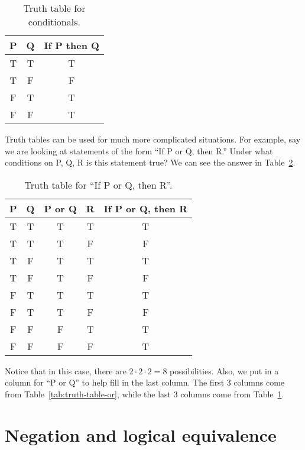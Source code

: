 \documentclass{tufte-book}
\begin{document}
\begin{table}
  \centering
  \begin{tabular}{ccc}
    \toprule
    P & Q & If P then Q \\ \midrule
    T & T & T \\
    T & F & F \\
    F & T & T \\
    F & F & T \\ \bottomrule
  \end{tabular}
  \caption{Truth table for conditionals.}
  \label{tab:truth-table-conditionals}
\end{table}
Truth tables can be used for much more complicated situations. For example, say we are looking at statements of the form ``If P or Q, then R.'' Under what conditions on P, Q, R is this statement true? We can see the answer in Table~\ref{tab:truth-table-if-p-or-q-then-r}.

\begin{table}
  \centering
  \begin{tabular}{ccccc}
    \toprule
    P & Q & P or Q & R & If P or Q, then R \\ \midrule
    T & T & T & T & T\\
    T & T & T & F & F\\
    T & F & T & T & T\\
    T & F & T & F & F\\ 
    F & T & T & T & T \\
    F & T & T & F & F \\
    F & F & F & T & T \\
    F & F & F & F & T \\
    \bottomrule
  \end{tabular}
  \caption{Truth table for ``If P or Q, then R''.}
  \label{tab:truth-table-if-p-or-q-then-r}
\end{table}
Notice that in this case, there are $2 \cdot 2 \cdot 2 = 8$ possibilities. Also, we put in a column for ``P or Q'' to help fill in the last column. The first 3 columns come from Table~\ref{tab:truth-table-or}, while the last 3 columns come from Table~\ref{tab:truth-table-conditionals}.



\section{Negation and logical equivalence}
\label{sec:negat-logic-equiv}
\end{document}
